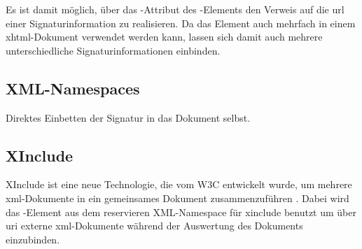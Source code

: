 Es ist damit möglich, über das -Attribut des -Elements den Verweis auf die \gls{url} einer Signaturinformation zu realisieren. Da das
Element auch mehrfach in einem \gls{xhtml}-Dokument verwendet werden kann, lassen sich damit auch mehrere unterschiedliche Signaturinformationen einbinden.



\subsection{XML-Namespaces}
Direktes Einbetten der Signatur in das Dokument selbst.



\subsection{XInclude}
XInclude ist eine neue Technologie, die vom W3C entwickelt wurde, um mehrere \gls{xml}-Dokumente in ein gemeinsames Dokument zusammenzuführen \cite{xml:oreilly}.
Dabei wird das -Element aus dem reservieren XML-Namespace für \gls{xinclude} benutzt um über \gls{uri} externe \gls{xml}-Dokumente während der
Auswertung des Dokuments einzubinden.


